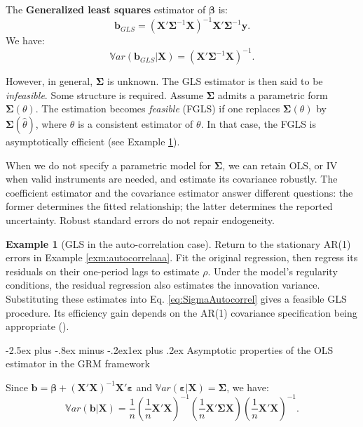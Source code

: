 \documentclass[
  11pt,
]{book}
\makeatletter
\renewcommand\subsection{\@startsection{subsection}{2}{\z@}
  {-2.5ex plus -.8ex minus -.2ex}{1ex plus .2ex}
  {\normalfont\large\bfseries\color{TextbookInk}}}
\theoremstyle{definition}
\theoremstyle{definition}
\newtheorem{example}{Example}[chapter]
\theoremstyle{definition}
\theoremstyle{definition}
\theoremstyle{remark}
\makeatother
\begin{document}
The \textbf{Generalized least squares} estimator of \(\boldsymbol\beta\) is:
\begin{equation}
\boxed{\mathbf{b}_{GLS} = (\mathbf{X}'\boldsymbol\Sigma^{-1}\mathbf{X})^{-1}\mathbf{X}'\boldsymbol\Sigma^{-1}\mathbf{y}.}\label{eq:betaGLS}
\end{equation}
We have:
\[
\mathbb{V}ar(\mathbf{b}_{GLS}|\mathbf{X}) = (\mathbf{X}'\boldsymbol\Sigma^{-1}\mathbf{X})^{-1}.
\]

However, in general, \(\boldsymbol\Sigma\) is unknown. The GLS estimator is then said to be \emph{infeasible}. Some structure is required. Assume \(\boldsymbol\Sigma\) admits a parametric form \(\boldsymbol\Sigma(\theta)\). The estimation becomes \emph{feasible} (FGLS) if one replaces \(\boldsymbol\Sigma(\theta)\) by \(\boldsymbol\Sigma(\hat\theta)\), where \(\hat\theta\) is a consistent estimator of \(\theta\). In that case, the FGLS is asymptotically efficient (see Example \ref{exm:autocorrelaaa2}).

When we do not specify a parametric model for \(\boldsymbol\Sigma\), we can retain OLS, or IV when valid instruments are needed, and estimate its covariance robustly. The coefficient estimator and the covariance estimator answer different questions: the former determines the fitted relationship; the latter determines the reported uncertainty. Robust standard errors do not repair endogeneity.

\begin{example}[GLS in the auto-correlation case]
\protect\hypertarget{exm:autocorrelaaa2}{}\label{exm:autocorrelaaa2}Return to the stationary AR(1) errors in Example \ref{exm:autocorrelaaa}. Fit the original regression, then regress its residuals on their one-period lags to estimate \(\rho\). Under the model's regularity conditions, the residual regression also estimates the innovation variance. Substituting these estimates into Eq. \eqref{eq:SigmaAutocorrel} gives a feasible GLS procedure. Its efficiency gain depends on the AR(1) covariance specification being appropriate (\citet{Cochrane_Orcutt_1949}).
\end{example}

\subsection{Asymptotic properties of the OLS estimator in the GRM framework}\label{asymptotic-properties-of-the-ols-estimator-in-the-grm-framework}

Since \(\mathbf{b} = \boldsymbol\beta + \left(\mathbf{X}'\mathbf{X}\right)^{-1} \mathbf{X}'\boldsymbol\varepsilon\) and \(\mathbb{V}ar(\boldsymbol\varepsilon|\mathbf{X})=\boldsymbol\Sigma\), we have:
\begin{equation}
\mathbb{V}ar(\mathbf{b}|\mathbf{X}) = \frac{1}{n}\left(\frac{1}{n}\mathbf{X}'\mathbf{X}\right)^{-1}\left(\frac{1}{n}\mathbf{X}'\boldsymbol\Sigma\mathbf{X}\right)\left(\frac{1}{n}\mathbf{X}'\mathbf{X}\right)^{-1}.\label{eq:xsx}
\end{equation}
\end{document}
